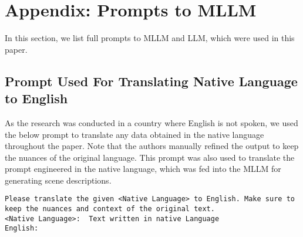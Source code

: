 \appendix



\section{Appendix: Prompts to MLLM}
In this section, we list full prompts to MLLM and LLM, which were used in this paper.


\subsection{Prompt Used For Translating Native Language to English}
\label{appendix:translate}
As the research was conducted in a country where English is not spoken, we used the below prompt to translate any data obtained in the native language throughout the paper. 
Note that the authors manually refined the output to keep the nuances of the original language.
This prompt was also used to translate the prompt engineered in the native language, which was fed into the MLLM for generating scene descriptions.
\begin{lstlisting}
Please translate the given <Native Language> to English. Make sure to keep the nuances and context of the original text.
<Native Language>:  Text written in native Language
English:
\end{lstlisting}


